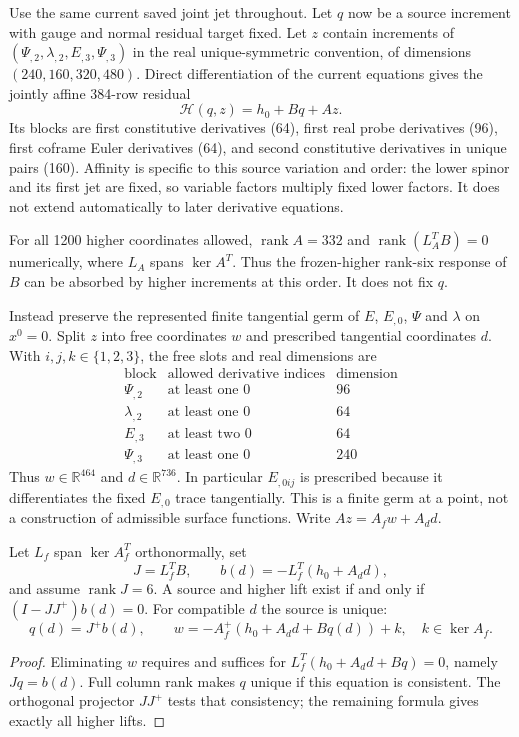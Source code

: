 Use the same current saved joint jet throughout. Let $q$ now be a source
increment with gauge and normal residual target fixed. Let $z$ contain
increments of $(\Psi_{,2},\lambda_{,2},E_{,3},\Psi_{,3})$ in the real
unique-symmetric convention, of dimensions $(240,160,320,480)$.
Direct differentiation of the current equations gives the jointly affine
384-row residual
\begin{equation}
 \mathcal H(q,z)=h_0+Bq+Az.
 \label{v490:higher-affine}
\end{equation}
Its blocks are first constitutive derivatives (64), first real probe
derivatives (96), first coframe Euler derivatives (64), and second
constitutive derivatives in unique pairs (160). Affinity is specific to
this source variation and order: the lower spinor and its first jet are
fixed, so variable factors multiply fixed lower factors. It does not
extend automatically to later derivative equations.

For all 1200 higher coordinates allowed, $\operatorname{rank}A=332$ and
$\operatorname{rank}(L_A^TB)=0$ numerically, where $L_A$ spans
$\ker A^T$. Thus the frozen-higher rank-six response of $B$ can be
absorbed by higher increments at this order. It does not fix $q$.

Instead preserve the represented finite tangential germ of $E$, $E_{,0}$,
$\Psi$ and $\lambda$ on $x^0=0$. Split $z$ into free coordinates $w$ and
prescribed tangential coordinates $d$. With $i,j,k\in\{1,2,3\}$, the
free slots and real dimensions are
\[
 \begin{array}{c|c|r}
 \text{block}&\text{allowed derivative indices}&\text{dimension}\\\hline
 \Psi_{,2}&\text{at least one }0&96\\
 \lambda_{,2}&\text{at least one }0&64\\
 E_{,3}&\text{at least two }0&64\\
 \Psi_{,3}&\text{at least one }0&240
 \end{array}
\]
Thus $w\in\mathbb R^{464}$ and $d\in\mathbb R^{736}$. In particular
$E_{,0ij}$ is prescribed because it differentiates the fixed $E_{,0}$
trace tangentially. This is a finite germ at a point, not a construction
of admissible surface functions. Write $Az=A_fw+A_dd$.

\begin{proposition}
\label{v490:source-law-theorem}
Let $L_f$ span $\ker A_f^T$ orthonormally, set
\[
 J=L_f^TB,\qquad b(d)=-L_f^T(h_0+A_dd),
\]
and assume $\operatorname{rank}J=6$. A source and higher lift exist if
and only if $(I-JJ^+)b(d)=0$. For compatible $d$ the source is unique:
\[
 q(d)=J^+b(d),\qquad
 w=-A_f^+(h_0+A_dd+Bq(d))+k,\quad k\in\ker A_f.
\]
\end{proposition}
\begin{proof}
Eliminating $w$ requires and suffices for
$L_f^T(h_0+A_dd+Bq)=0$, namely $Jq=b(d)$.
Full column rank makes $q$ unique if this equation is consistent.
The orthogonal projector $JJ^+$ tests that consistency; the remaining
formula gives exactly all higher lifts.
\end{proof}

